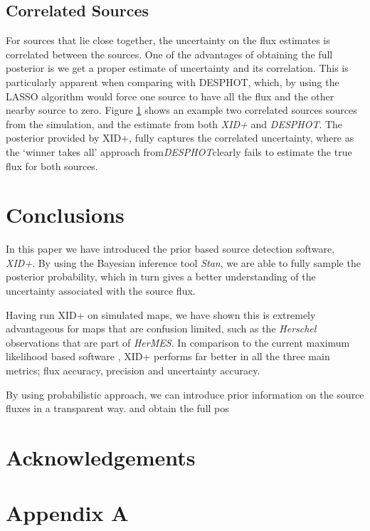 \documentclass[useAMS,usenatbib]{mnras}
\begin{document}
\subsection{Correlated Sources}
For sources that lie close together, the uncertainty on the flux estimates is correlated between the sources. One of the advantages of obtaining the full posterior is we get a proper estimate of uncertainty and its correlation. This is particularly apparent when comparing with DESPHOT, which, by using the LASSO algorithm would force one source to have all the flux and the other nearby source to zero. Figure \ref{} shows an example two correlated sources sources from the simulation, and the estimate from both \emph{XID+} and \emph{DESPHOT}. The posterior provided by XID+, fully captures the correlated uncertainty, where as the `winner takes all' approach from\emph{DESPHOT}clearly fails to estimate the true flux for both sources.
 


\section{Conclusions}
In this paper we have introduced the prior based source detection software, \emph{XID+}. By using the Bayesian inference tool \emph{Stan}, we are able to fully sample the posterior probability, which in turn gives a better understanding of the uncertainty associated with the source flux. 

Having run XID+ on simulated maps, we have shown this is extremely advantageous for maps that are confusion limited, such as the \emph{Herschel} observations that are part of \emph{HerMES}. In comparison to the current maximum likelihood based software , XID+ performs far better in all the three main metrics; flux accuracy, precision and uncertainty accuracy.
 
 
By using probabilistic approach, we can introduce prior information on the source fluxes in a transparent way. and obtain the full pos


\section*{Acknowledgements} %
%
%
%

\appendix
\section*{Appendix A}\label{Stan_model}
\onecolumn

%
%
%
%
%
%
%
\end{document}
